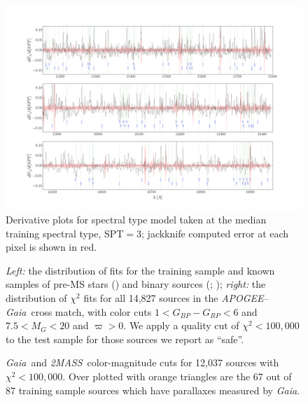 \documentclass[modern]{aastex62}
\newcommand{\apogee}{\textsl{APOGEE}}
\newcommand{\gaia}{\textsl{Gaia}}
\newcommand{\zmass}{\textsl{2MASS}}
\begin{document}
\begin{figure}[ht]
\begin{center}
\includegraphics[width=16cm]{figures/derivative_jackknife_spt.png}
\end{center}
\caption{Derivative plots for spectral type model taken at the median training spectral type, SPT$=3$; jackknife computed error at each pixel is shown in red.} \label{fig:west_derivative}
\end{figure}

\begin{figure}[ht]
\caption{\textit{Left:} the distribution of fits for the training sample and known samples of pre-MS stars (\citealt{Cottaar:2014}) and binary sources (\citealt{ElBadry:2018}; \citealt{Skinner:2018}); \textit{right:} the distribution of $\chi^2$ fits for all 14,827 sources in the \apogee --\gaia\ cross match, with color cuts $1<G_{BP}-G_{RP}<6$ and $7.5<M_{G}<20$ and $\varpi>0$. We apply a quality cut of $\chi^2 < 100,000$ to the test sample for those sources we report as ``safe''. \label{fig:chi_dist}}
\end{figure}

\begin{figure}[ht]
\caption{\gaia\ and \zmass\ color-magnitude cuts for 12,037 sources with $\chi^2<100,000$. Over plotted with orange triangles are the 67 out of 87 training sample sources which have parallaxes measured by \gaia. \label{fig:cmd_selection}}
\end{figure}
\end{document}
